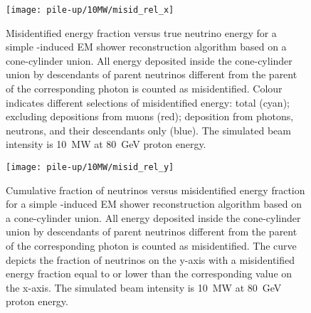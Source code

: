 \begin{figure}[htb]
	\centering
	\texttt{[image: pile-up/10MW/misid\_rel\_x]}
	\caption{Misidentified energy fraction versus true neutrino energy for a simple \Pgpz-induced EM shower reconstruction algorithm based on a cone-cylinder union.
		All energy deposited inside the cone-cylinder union by descendants of parent neutrinos different from the parent of the corresponding \Pgpz photon is counted as misidentified.
		Colour indicates different selections of misidentified energy: total (cyan); excluding depositions from muons (red); deposition from photons, neutrons, and their descendants only (blue).
		The simulated beam intensity is \SI{10}{\mega\watt} at \SI{80}{\giga\electronvolt} proton energy.}
\end{figure}

\begin{figure}[htb]
	\centering
	\texttt{[image: pile-up/10MW/misid\_rel\_y]}
	\caption{Cumulative fraction of neutrinos versus misidentified energy fraction for a simple \Pgpz-induced EM shower reconstruction algorithm based on a cone-cylinder union.
		All energy deposited inside the cone-cylinder union by descendants of parent neutrinos different from the parent of the corresponding \Pgpz photon is counted as misidentified.
		The curve depicts the fraction of neutrinos on the y-axis with a misidentified energy fraction equal to or lower than the corresponding value on the x-axis.
		The simulated beam intensity is \SI{10}{\mega\watt} at \SI{80}{\giga\electronvolt} proton energy.}
\end{figure}